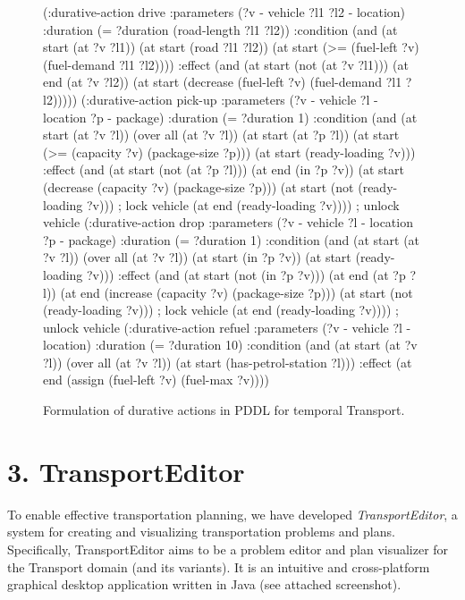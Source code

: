 \begin{figure}[p]
\begin{code}
(:durative-action drive
  :parameters (?v - vehicle ?l1 ?l2 - location)
  :duration (= ?duration (road-length ?l1 ?l2))
  :condition (and
      (at start (at ?v ?l1))
      (at start (road ?l1 ?l2))
      (at start (>= (fuel-left ?v) (fuel-demand ?l1 ?l2))))
  :effect (and
      (at start (not (at ?v ?l1)))
      (at end (at ?v ?l2))
      (at start (decrease (fuel-left ?v) (fuel-demand ?l1 ?l2)))))
(:durative-action pick-up
  :parameters (?v - vehicle ?l - location ?p - package)
  :duration (= ?duration 1)
  :condition (and
      (at start (at ?v ?l))
      (over all (at ?v ?l))
      (at start (at ?p ?l))
      (at start (>= (capacity ?v) (package-size ?p)))
      (at start (ready-loading ?v)))
  :effect (and
      (at start (not (at ?p ?l)))
      (at end (in ?p ?v))
      (at start (decrease (capacity ?v) (package-size ?p)))
      (at start (not (ready-loading ?v))) ; lock vehicle
      (at end (ready-loading ?v)))) ; unlock vehicle
(:durative-action drop
  :parameters (?v - vehicle ?l - location ?p - package)
  :duration (= ?duration 1)
  :condition (and
      (at start (at ?v ?l))
      (over all (at ?v ?l))
      (at start (in ?p ?v))
      (at start (ready-loading ?v)))
  :effect (and (at start (not (in ?p ?v)))
      (at end (at ?p ?l))
      (at end (increase (capacity ?v) (package-size ?p)))
      (at start (not (ready-loading ?v))) ; lock vehicle
      (at end (ready-loading ?v)))) ; unlock vehicle
(:durative-action refuel
  :parameters (?v - vehicle ?l - location)
  :duration (= ?duration 10)
  :condition (and
      (at start (at ?v ?l))
      (over all (at ?v ?l))
      (at start (has-petrol-station ?l)))
  :effect
      (at end (assign (fuel-left ?v) (fuel-max ?v))))
\end{code}
\caption*{Formulation of durative actions in PDDL for temporal Transport.}
\label{code:pddl-temporal}
\end{figure}

\newpage

\section*{3. TransportEditor}\label{editor}

To enable effective transportation planning,
we have developed \textit{TransportEditor}, a system for creating and visualizing transportation problems and plans.
Specifically, TransportEditor aims to be a problem editor and plan visualizer for the Transport domain (and its variants). It is an intuitive and cross-platform graphical desktop application
written in Java (see attached screenshot).

